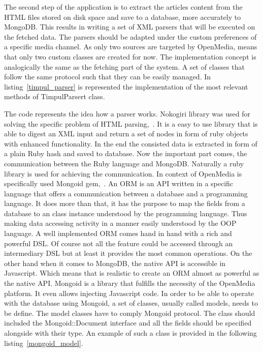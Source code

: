 The second step of the application is to extract the articles content from the HTML files stored on disk space and save to a database, more accurately to MongoDB. This results in writing a set of XML parsers that will be executed on the fetched data. The parsers should be adapted under the custom preferences of a specific media channel. As only two sources are targeted by OpenMedia, means that only two custom classes are created for now. The implementation concept is analogically the same as the fetching part of the system. A set of classes that follow the same protocol such that they can be easily managed. In \mbox{listing \ref{timpul_parser}} is represented the implementation of the most relevant methods of TimpulParsert class.



The code represents the idea how a parser works. Nokogiri library was used for solving the specific problem of HTML \mbox{parsing, \cite{nokogiri_gem}}. It is a easy to use library that is able to digest an XML input and return a set of nodes in form of ruby objects with enhanced functionality. In the end the consisted data is extracted in form of a plain Ruby hash and saved to database. Now the important part comes, the communication between the Ruby language and MongoDB. Naturally a ruby library is used for achieving the communication. In context of OpenMedia is specifically used Mongoid \mbox{gem, \cite{mongoid_gem}}. An ORM is an API written in a specific language that offers a communication between a database and a programming language. It does more than that, it has the purpose to map the fields from a database to an class instance understood by the programming language. Thus making data accessing activity in a manner easily understood by the OOP language. A well implemented ORM comes hand in hand with a rich and powerful DSL. Of course not all the feature could be accessed through an intermediary DSL but at least it provides the most common operations. On the other hand when it comes to MongoDB, the native API is accessible in Javascript. Which means that is realistic to create an ORM almost as powerful as the native API. Mongoid is a library that fulfills the necessity of the OpenMedia platform. It even allows injecting Javascript code. In order to be able to operate with the database using Mongoid, a set of classes, usually called models, needs to be define. The model classes have to comply Mongoid protocol. The class should included the Mongoid::Document interface and all the fields should be specified alongside with their type. An example of such a class is provided in the following \mbox{listing \ref{mongoid_model}}.


